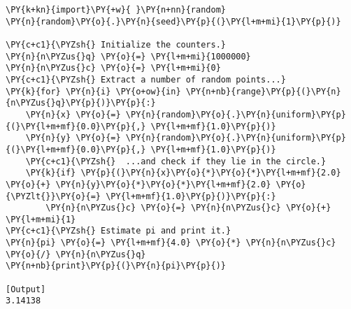 \begin{Verbatim}[label=\makebox{\href{https://github.com/unipi-physics-labs/lab1-notes/tree/main/snippy/mc_pi.py}{https://github.com/.../mc\_pi.py}},commandchars=\\\{\}]
\PY{k+kn}{import}\PY{+w}{ }\PY{n+nn}{random}
\PY{n}{random}\PY{o}{.}\PY{n}{seed}\PY{p}{(}\PY{l+m+mi}{1}\PY{p}{)}

\PY{c+c1}{\PYZsh{} Initialize the counters.}
\PY{n}{n\PYZus{}q} \PY{o}{=} \PY{l+m+mi}{1000000}
\PY{n}{n\PYZus{}c} \PY{o}{=} \PY{l+m+mi}{0}
\PY{c+c1}{\PYZsh{} Extract a number of random points...}
\PY{k}{for} \PY{n}{i} \PY{o+ow}{in} \PY{n+nb}{range}\PY{p}{(}\PY{n}{n\PYZus{}q}\PY{p}{)}\PY{p}{:}
    \PY{n}{x} \PY{o}{=} \PY{n}{random}\PY{o}{.}\PY{n}{uniform}\PY{p}{(}\PY{l+m+mf}{0.0}\PY{p}{,} \PY{l+m+mf}{1.0}\PY{p}{)}
    \PY{n}{y} \PY{o}{=} \PY{n}{random}\PY{o}{.}\PY{n}{uniform}\PY{p}{(}\PY{l+m+mf}{0.0}\PY{p}{,} \PY{l+m+mf}{1.0}\PY{p}{)}
    \PY{c+c1}{\PYZsh{}  ...and check if they lie in the circle.}
    \PY{k}{if} \PY{p}{(}\PY{n}{x}\PY{o}{*}\PY{o}{*}\PY{l+m+mf}{2.0} \PY{o}{+} \PY{n}{y}\PY{o}{*}\PY{o}{*}\PY{l+m+mf}{2.0} \PY{o}{\PYZlt{}}\PY{o}{=} \PY{l+m+mf}{1.0}\PY{p}{)}\PY{p}{:}
        \PY{n}{n\PYZus{}c} \PY{o}{=} \PY{n}{n\PYZus{}c} \PY{o}{+} \PY{l+m+mi}{1}
\PY{c+c1}{\PYZsh{} Estimate pi and print it.}
\PY{n}{pi} \PY{o}{=} \PY{l+m+mf}{4.0} \PY{o}{*} \PY{n}{n\PYZus{}c} \PY{o}{/} \PY{n}{n\PYZus{}q}
\PY{n+nb}{print}\PY{p}{(}\PY{n}{pi}\PY{p}{)}

[Output]
3.14138
\end{Verbatim}
